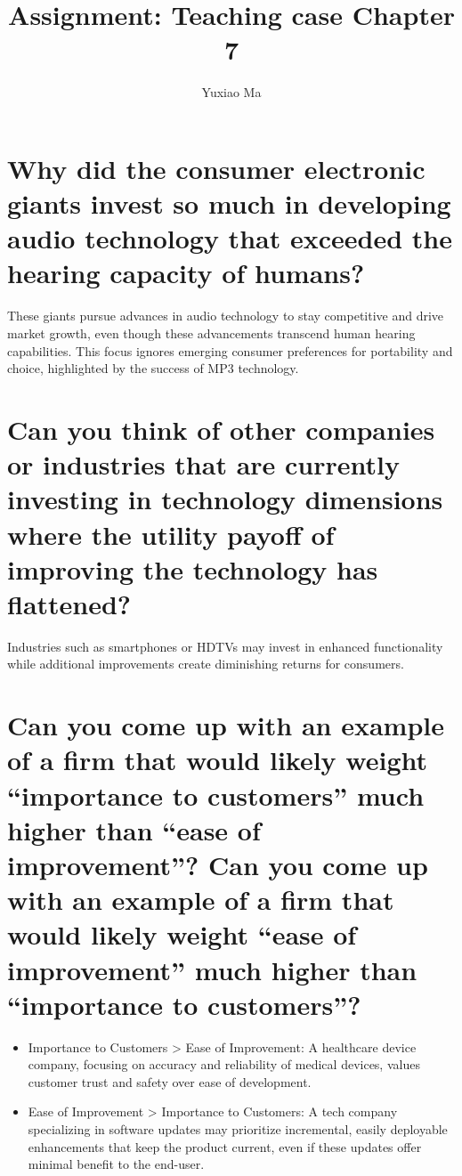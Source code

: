 \documentclass[UTF8,a4paper,AutoFakeBold,AutoFakeSlant]{article}
\title{\textbf{\textsf{{\textsf{Assignment: Teaching case Chapter 7}}}}}
\author{\tnewroman Yuxiao Ma}
\date{}
\begin{document}
\maketitle


\section{Why did the consumer electronic giants invest so much in developing audio technology that exceeded the hearing capacity of humans?}

These giants pursue advances in audio technology to stay competitive and drive market growth, even though these advancements transcend human hearing capabilities. This focus ignores emerging consumer preferences for portability and choice, highlighted by the success of MP3 technology.



\section{Can you think of other companies or industries that are currently investing in technology dimensions where the utility payoff of improving the technology has flattened?}

Industries such as smartphones or HDTVs may invest in enhanced functionality while additional improvements create diminishing returns for consumers.



\section{Can you come up with an example of a firm that would likely weight “importance to customers” much higher than “ease of improvement”? Can you come up with an example of a firm that would likely weight “ease of improvement” much higher than “importance to customers”? }

\begin{itemize}
    \item Importance to Customers > Ease of Improvement: A healthcare device company, focusing on accuracy and reliability of medical devices, values customer trust and safety over ease of development.
    \item Ease of Improvement > Importance to Customers: A tech company specializing in software updates may prioritize incremental, easily deployable enhancements that keep the product current, even if these updates offer minimal benefit to the end-user.
\end{itemize}

% 
% 
% 
\end{document}
